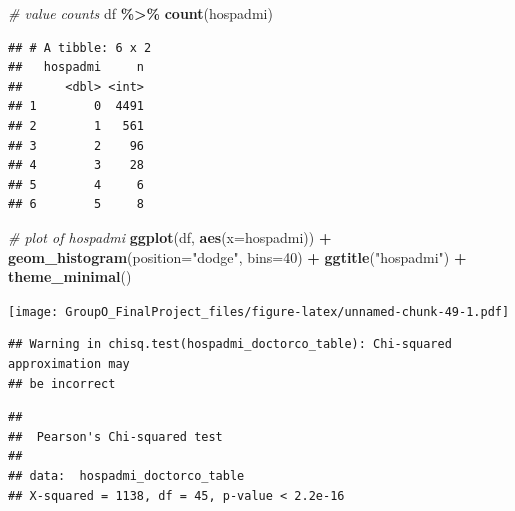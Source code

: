 \documentclass[
]{article}
\newenvironment{Shaded}{\begin{snugshade}}{\end{snugshade}}
\newcommand{\AttributeTok}[1]{\textcolor[rgb]{0.13,0.29,0.53}{#1}}
\newcommand{\CommentTok}[1]{\textcolor[rgb]{0.56,0.35,0.01}{\textit{#1}}}
\newcommand{\DecValTok}[1]{\textcolor[rgb]{0.00,0.00,0.81}{#1}}
\newcommand{\FunctionTok}[1]{\textcolor[rgb]{0.13,0.29,0.53}{\textbf{#1}}}
\newcommand{\NormalTok}[1]{#1}
\newcommand{\OtherTok}[1]{\textcolor[rgb]{0.56,0.35,0.01}{#1}}
\newcommand{\SpecialCharTok}[1]{\textcolor[rgb]{0.81,0.36,0.00}{\textbf{#1}}}
\newcommand{\StringTok}[1]{\textcolor[rgb]{0.31,0.60,0.02}{#1}}
\begin{document}
\begin{Shaded}
\begin{Highlighting}[]
\CommentTok{\# value counts}
\NormalTok{df }\SpecialCharTok{\%\textgreater{}\%} \FunctionTok{count}\NormalTok{(hospadmi)}
\end{Highlighting}
\end{Shaded}

\begin{verbatim}
## # A tibble: 6 x 2
##   hospadmi     n
##      <dbl> <int>
## 1        0  4491
## 2        1   561
## 3        2    96
## 4        3    28
## 5        4     6
## 6        5     8
\end{verbatim}

\begin{Shaded}
\begin{Highlighting}[]
\CommentTok{\# plot of hospadmi}
\FunctionTok{ggplot}\NormalTok{(df, }\FunctionTok{aes}\NormalTok{(}\AttributeTok{x=}\NormalTok{hospadmi)) }\SpecialCharTok{+}
  \FunctionTok{geom\_histogram}\NormalTok{(}\AttributeTok{position=}\StringTok{"dodge"}\NormalTok{, }\AttributeTok{bins=}\DecValTok{40}\NormalTok{) }\SpecialCharTok{+}
  \FunctionTok{ggtitle}\NormalTok{(}\StringTok{"hospadmi"}\NormalTok{) }\SpecialCharTok{+}
  \FunctionTok{theme\_minimal}\NormalTok{()}
\end{Highlighting}
\end{Shaded}

\texttt{[image: GroupO\_FinalProject\_files/figure-latex/unnamed-chunk-49-1.pdf]}

\begin{Shaded}
\end{Shaded}

\begin{verbatim}
## Warning in chisq.test(hospadmi_doctorco_table): Chi-squared approximation may
## be incorrect
\end{verbatim}

\begin{verbatim}
## 
##  Pearson's Chi-squared test
## 
## data:  hospadmi_doctorco_table
## X-squared = 1138, df = 45, p-value < 2.2e-16
\end{verbatim}
\end{document}
